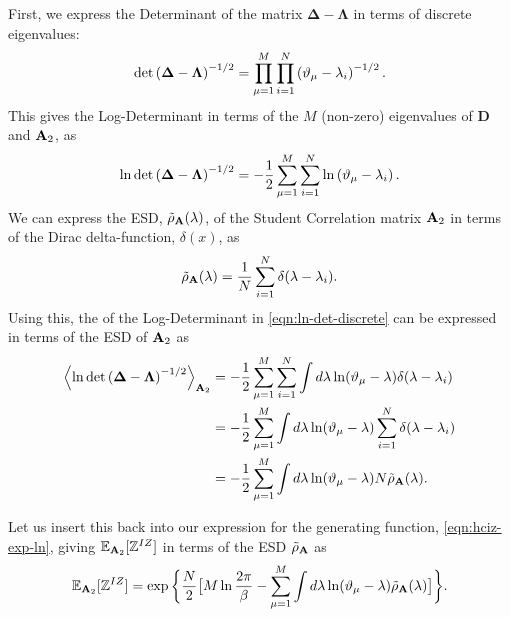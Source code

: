 First, we express the Determinant of the matrix $\mathbf{\Delta}-\mathbf{\Lambda}$ in terms of discrete eigenvalues:
\begin{equation}
\label{eqn:det-discrete}
    \det\left(\mathbf{\Delta}-\mathbf{\Lambda}\right)^{-1/2}=\prod_{\mu=1}^{M}\prod_{i=1}^{N}\left(\DeltaMu-\lambda_{i}\right)^{-1/2}  .
\end{equation}
%
This gives the Log-Determinant in terms of the $M$ (non-zero)
eigenvalues of $\mathbf{D}$ and $\mathbf{A}_{2}$, as
\begin{equation}
\label{eqn:ln-det-discrete}
    \ln\det\left(\mathbf{\Delta}-\mathbf{\Lambda}\right)^{-1/2}=-\dfrac{1}{2}\sum_{\mu=1}^{M}\sum_{i=1}^{N}\ln\left(\DeltaMu-\lambda_{i}\right)  .
\end{equation}
%
We can express %
the ESD, $\tilde\rho_{\mathbf{A}}(\lambda)$, of the 
Student Correlation 
matrix
$\mathbf{A}_{2}$ in terms of the Dirac delta-function, $\delta(x)$, as
\begin{equation}
\label{eqn:rho-emp}
    \tilde\rho_{\AMAT}(\lambda)=\frac{1}{N}\sum_{i=1}^{N}\delta(\lambda-\lambda_{i})  .
\end{equation}
Using this, the \ExpectedValue of the Log-Determinant 
in \ref{eqn:ln-det-discrete}
can be expressed in terms of the ESD of
$\mathbf{A}_{2}$ as
\begin{align}
\nonumber
\Expected[\AMAT_{2}]{\ln\det\left(\mathbf{\Delta}-\mathbf{\Lambda}\right)^{-1/2}}
   & = -\dfrac{1}{2}\sum_{\mu=1}^{M}\sum_{i=1}^{N}\int
       d\lambda\ln(\DeltaMu-\lambda)\delta(\lambda-\lambda_{i}) \\ 
\nonumber
   & = -\dfrac{1}{2}\sum_{\mu=1}^{M}\int
       d\lambda\ln(\DeltaMu-\lambda)\sum_{i=1}^{N}\delta(\lambda-\lambda_{i}) \\ 
\label{eqn:ln-det-rho}
   & = -\dfrac{1}{2}\sum_{\mu=1}^{M}\int
       d\lambda\ln(\DeltaMu-\lambda)
       N\tilde\rho_{\AMAT}(\lambda)  .
\end{align}

Let us insert this back into our
expression for the generating function,
\ref{eqn:hciz-exp-ln},   %
giving
$\mathbb{E}_{\mathbf{A}_2}[\mathbb{Z}^{IZ}]$ in terms of the ESD $\tilde{\rho}_{\mathbf{A}}$ as
\begin{equation}
\label{eqn:Z-rho}
    \EZDATWO=\exp\bigg\{\dfrac{N}{2}\big[M\ln\dfrac{2\pi}{\beta}-\sum_{\mu=1}^{M}\int
        d\lambda\ln(\DeltaMu-\lambda)\tilde{\rho}_{\AMAT}(\lambda)\big]\bigg\}  .
\end{equation}


